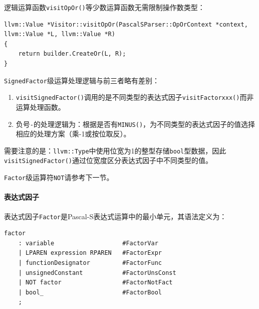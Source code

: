 \documentclass[lang=cn,11pt,a4paper,cite=authornum]{paper}
\begin{document}
逻辑运算函数\texttt{visitOpOr()}等少数运算函数无需限制操作数类型：

\begin{code}
    \begin{verbatim}
llvm::Value *Visitor::visitOpOr(PascalSParser::OpOrContext *context, llvm::Value *L, llvm::Value *R)
{
    return builder.CreateOr(L, R);
}
\end{verbatim}
\end{code}

\texttt{SignedFactor}级运算处理逻辑与前三者略有差别：

\begin{enumerate}
    \item \texttt{visitSignedFactor()}调用的是不同类型的表达式因子\texttt{visitFactorxxx()}而非运算处理函数。
    \item 负号\texttt{-}的处理逻辑为：根据是否有\texttt{MINUS()}，为不同类型的表达式因子的值选择相应的处理方案（乘-1或按位取反）。
\end{enumerate}

需要注意的是：\texttt{llvm::Type}中使用位宽为1的整型存储\texttt{bool}型数据，因此\texttt{visitSignedFactor()}通过位宽度区分表达式因子中不同类型的值。

\texttt{Factor}级运算符\texttt{NOT}请参考下一节。

\paragraph{表达式因子}

表达式因子\texttt{Factor}是Pascal-S表达式运算中的最小单元，其语法定义为：

\begin{code}
    \begin{verbatim}
factor
    : variable                   #FactorVar
    | LPAREN expression RPAREN   #FactorExpr
    | functionDesignator         #FactorFunc
    | unsignedConstant           #FactorUnsConst
    | NOT factor                 #FactorNotFact
    | bool_                      #FactorBool
    ;
\end{verbatim}
\end{code}
\end{document}
